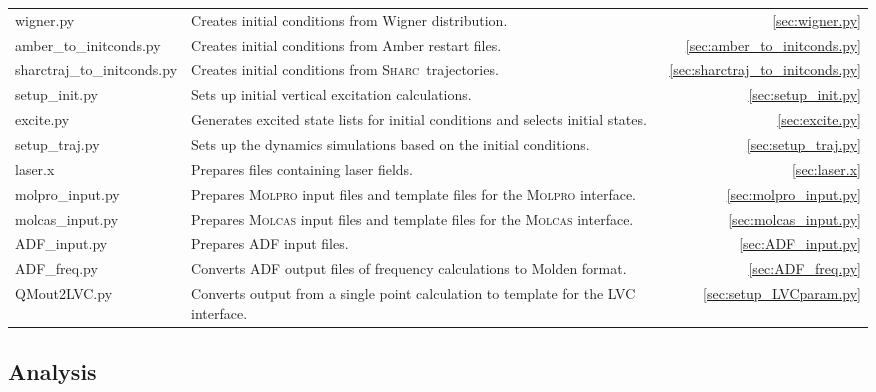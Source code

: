 \documentclass[a4paper,10pt,DIV=15,openany]{scrbook}
\newcommand{\sharc}{\textsc{Sharc}}
\begin{document}
\begin{tabular}{>{\ttfamily}lp{10.5cm}r}
  wigner.py             &Creates initial conditions from Wigner distribution.                   &\ref{sec:wigner.py}\\
  amber\_to\_initconds.py       &Creates initial conditions from Amber restart files.           &\ref{sec:amber_to_initconds.py}\\
  sharctraj\_to\_initconds.py   &Creates initial conditions from \sharc\ trajectories.          &\ref{sec:sharctraj_to_initconds.py}\\
  setup\_init.py        &Sets up initial vertical excitation calculations.                      &\ref{sec:setup_init.py}\\
  excite.py             &Generates excited state lists for initial conditions and selects initial states.                 &\ref{sec:excite.py}\\
  setup\_traj.py        &Sets up the dynamics simulations based on the initial conditions.      &\ref{sec:setup_traj.py}\\
  laser.x               &Prepares files containing laser fields.                                &\ref{sec:laser.x}\\
  molpro\_input.py      &Prepares \textsc{Molpro} input files and template files for the \textsc{Molpro} interface.                  &\ref{sec:molpro_input.py}\\
  molcas\_input.py      &Prepares \textsc{Molcas} input files and template files for the \textsc{Molcas} interface.             &\ref{sec:molcas_input.py}\\
  ADF\_input.py         &Prepares ADF input files.                     &\ref{sec:ADF_input.py}\\
  ADF\_freq.py          &Converts ADF output files of frequency calculations to Molden format.                     &\ref{sec:ADF_freq.py}\\
  QMout2LVC.py          &Converts output from a single point calculation to template for the LVC interface.             &\ref{sec:setup_LVCparam.py}\\
\end{tabular}

\subsection{Analysis}
\end{document}

